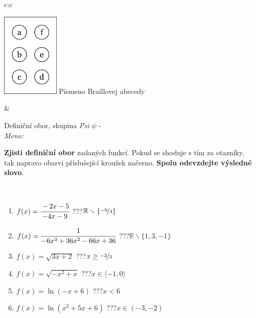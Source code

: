\documentclass[10pt]{report}
\begin{document}
\begin{tabular}{c:c}
\begin{minipage}[c][104.5mm][t]{0.5\linewidth}
\begin{center}
\begin{minipage}{0.20\linewidth}
\begin{center}
\includegraphics[height=40mm]{../images/braille.png}
{\small Písmeno Braillovej abecedy}
\end{center}
\end{minipage}
\end{center}
\end{minipage}
&
\begin{minipage}[c][104.5mm][t]{0.5\linewidth}
\begin{center}
\vspace{7mm}
{\huge Definiční obor, skupina \textit{Psi $\psi$} -}\\[5mm]
\textit{Meno:}\phantom{xxxxxxxxxxxxxxxxxxxxxxxxxxxxxxxxxxxxxxxxxxxxxxxxxxxxxxxxxxxxxxxxx}\\[5mm]
\begin{minipage}{0.95\linewidth}
\textbf{Zjisti definiční obor} zadaných funkcí. Pokud se shoduje s tím za otazníky,\\tak napravo obarvi příslušející kroužek načerno. \textbf{Spolu odevzdejte výsledné slovo}.
\end{minipage}
\\[1mm]
\begin{minipage}{0.79\linewidth}
\begin{center}
\begin{varwidth}{\linewidth}
\begin{enumerate}
\normalsizerrr
\item $f(x)=\cfrac{-2x-5}{-4x-9}$\quad \dotfill\; ???\;\dotfill \quad $\mathbb{R}\smallsetminus\{\nicefrac{-9}{4}\}$
\item $f(x)=\cfrac{1}{-6x^3+36x^2-66x+36}$\quad \dotfill\; ???\;\dotfill \quad $\mathbb{R}\smallsetminus\{1,3,-1\}$
\item $f(x)=\sqrt{3x+2}$\quad \dotfill\; ???\;\dotfill \quad $x\geq\nicefrac{-2}{3}$
\item $f(x)=\sqrt{-x^2+x}$\quad \dotfill\; ???\;\dotfill \quad $x\in\langle-1 , 0\rangle$
\item $f(x)=\ln{(-x+6)}$\quad \dotfill\; ???\;\dotfill \quad $x<6$
\item $f(x)=\ln{(x^2+5x+6)}$\quad \dotfill\; ???\;\dotfill \quad $x\in(-3 , -2)$

\end{enumerate}
\end{varwidth}
\end{center}
\end{minipage}
\end{center}
\end{minipage}
\end{tabular}
\end{document}
